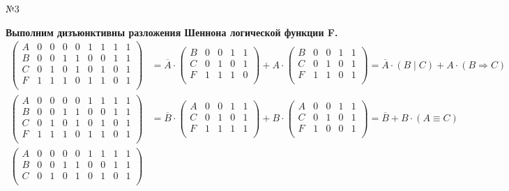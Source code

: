 \documentclass[]{article}
\begin{document}
\begin{center}\begin{large}{№3}\end{large}\end{center}
\textbf{Выполним дизъюнктивны разложения Шеннона логической функции F.}
	\[
\begin{aligned}
	\begin{pmatrix}
	A&0&0&0&0&1&1&1&1\\
	B&0&0&1&1&0&0&1&1\\
	C&0&1&0&1&0&1&0&1\\
	F&1&1&1&0&1&1&0&1\\
	\end{pmatrix}
	&=\overline{A}\cdot
	\begin{pmatrix}
	B&0&0&1&1\\
	C&0&1&0&1\\
	F&1&1&1&0\\
	\end{pmatrix}
	+A\cdot
	\begin{pmatrix}
	B&0&0&1&1\\
	C&0&1&0&1\\
	F&1&1&0&1\\
	\end{pmatrix}
	=\overline{A}\cdot (B\mid C)+A\cdot (B\Rightarrow C) 
	\\
	\begin{pmatrix}
	A&0&0&0&0&1&1&1&1\\
	B&0&0&1&1&0&0&1&1\\
	C&0&1&0&1&0&1&0&1\\
	F&1&1&1&0&1&1&0&1\\
	\end{pmatrix}
	&=\overline{B}\cdot
	\begin{pmatrix}
	A&0&0&1&1\\
	C&0&1&0&1\\
	F&1&1&1&1\\
	\end{pmatrix}
	+B\cdot
	\begin{pmatrix}
	A&0&0&1&1\\
	C&0&1&0&1\\
	F&1&0&0&1\\
	\end{pmatrix}
	=\overline{B}+B\cdot (A\equiv C) 
	\\
	\begin{pmatrix}
	A&0&0&0&0&1&1&1&1\\
	B&0&0&1&1&0&0&1&1\\
	C&0&1&0&1&0&1&0&1\\

\end{pmatrix}
\end{aligned}\]
\end{document}
